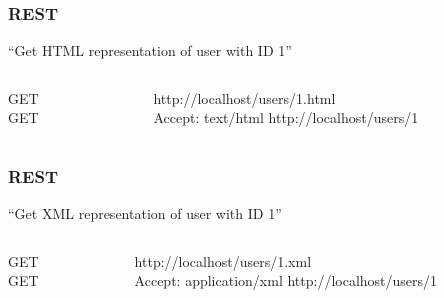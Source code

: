 
\begin{frame}
  \frametitle{REST}
  \begin{center}
  ``Get HTML representation of user with ID 1''
  \end{center}
  \begin{columns}
    \begin{column}{.2\textwidth}
      \begin{flushright}
      GET\\
      GET
      \end{flushright}
    \end{column}    
    \begin{column}{.8\textwidth}
      \begin{flushleft}
      http://localhost/users/1\alert{.html}\\
      \alert{Accept: text/html} http://localhost/users/1
      \end{flushleft}
    \end{column}    
  \end{columns}
\end{frame}

\begin{frame}
  \frametitle{REST}
  \begin{center}
  ``Get XML representation of user with ID 1''
  \end{center}
  \begin{columns}
    \begin{column}{.2\textwidth}
      \begin{flushright}
      GET\\
      GET
      \end{flushright}
    \end{column}    
    \begin{column}{.8\textwidth}
      \begin{flushleft}
      http://localhost/users/1\alert{.xml}\\
      \alert{Accept: application/xml} http://localhost/users/1
      \end{flushleft}
    \end{column}    
  \end{columns}
\end{frame}

